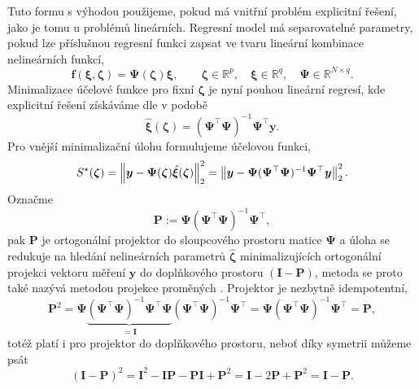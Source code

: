Tuto formu s výhodou použijeme, pokud má vnitřní problém explicitní řešení, jako je tomu u problémů lineárních. Regresní model má separovatelné parametry, pokud lze příslušnou regresní funkci zapsat ve tvaru lineární kombinace nelineárních funkcí,
\begin{equation}
    \bm{f}(\bm{\xi},\bm{\zeta})=\mathbf{\Psi}(\bm{\zeta})\bm{\xi},\qquad \bm{\zeta}\in\mathbb{R}^p,\quad \bm{\xi}\in\mathbb{R}^q,\quad\mathbf{\Psi}\in\mathbb{R}^{N\times q}.
\end{equation}
Minimalizace účelové funkce pro fixní $\bm{\zeta}$ je nyní pouhou lineární regresí, kde explicitní řešení získáváme dle  v podobě
\begin{equation}
    \hat{\bm{\xi}}(\bm{\zeta})=(\mathbf{\Psi}^\top\mathbf{\Psi})^{-1}\mathbf{\Psi}^\top\bm{y}.
\end{equation}
Pro vnější minimalizační úlohu formulujeme účelovou funkci,
\begin{equation}
    S^\star(\bm{\zeta})=\left\lVert\bm{y}-\mathbf{\Psi}(\bm{\zeta})\hat{\bm{\xi}}(\bm{\zeta})\right\rVert_2^2=\left\lVert\bm{y}-\mathbf{\Psi}(\mathbf{\Psi}^\top\mathbf{\Psi})^{-1}\mathbf{\Psi}^\top\bm{y}\right\rVert_2^2.
\end{equation}
Označme
\begin{equation}
    \mathbf{P}:=\mathbf{\Psi}(\mathbf{\Psi}^\top\mathbf{\Psi})^{-1}\mathbf{\Psi}^\top,
\end{equation}
pak $\mathbf{P}$ je ortogonální projektor do sloupcového prostoru matice $\mathbf{\Psi}$ a úloha se redukuje na hledání nelineárních parametrů $\hat{\bm{\zeta}}$ minimalizujících ortogonální projekci vektoru měření $\bm{y}$ do doplňkového prostoru $\left(\mathbf{I}-\mathbf{P}\right)$, metoda se proto také nazývá metodou projekce proměných . Projektor je nezbytně idempotentní,
\begin{equation}
    \mathbf{P}^2=\mathbf{\Psi}\underbrace{(\mathbf{\Psi}^\top\mathbf{\Psi})^{-1}\mathbf{\Psi}^\top\mathbf{\Psi}}_{=\mathbf{I}}(\mathbf{\Psi}^\top\mathbf{\Psi})^{-1}\mathbf{\Psi}^\top=\mathbf{\Psi}(\mathbf{\Psi}^\top\mathbf{\Psi})^{-1}\mathbf{\Psi}^\top=\mathbf{P},
\end{equation}
totéž platí i pro projektor do doplňkového prostoru, neboť díky symetrii můžeme psát
\begin{equation}
    (\mathbf{I}-\mathbf{P})^2=\mathbf{I}^2-\mathbf{I}\mathbf{P}-\mathbf{P}\mathbf{I}+\mathbf{P}^2=\mathbf{I}-2\mathbf{P}+\mathbf{P}^2=\mathbf{I}-\mathbf{P}.
\end{equation}

